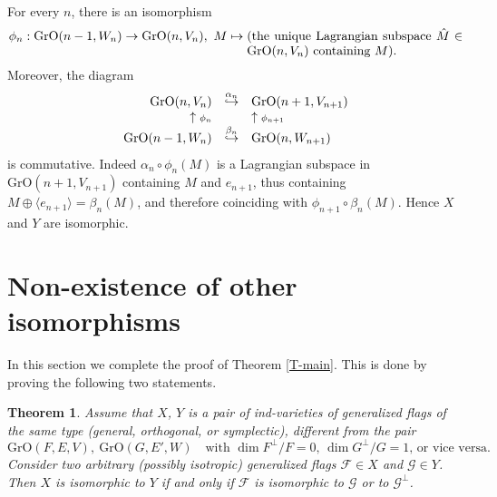 \documentclass[12pt]{amsart}
\newcommand{\OGrass}{\mathrm{GrO}}
\newtheorem{theorem}{Theorem}[section]
\theoremstyle{definition}
\begin{document}
For every $n$, there is an isomorphism
$$
\phi_n:\OGrass(n-1,W_n)\to \OGrass(n,V_n),\ M\mapsto\parbox[t]{6cm}{(the unique Lagrangian subspace $\hat{M}\in \OGrass(n,V_n)$ containing $M$).}
$$
Moreover, the  diagram
$$
\begin{array}{rcl}
\OGrass(n,V_n) & \stackrel{\alpha_n}{\hookrightarrow} & \OGrass(n+1,V_{n+1}) \\
\uparrow\mbox{\scriptsize $\phi_n$} & & \uparrow\mbox{\scriptsize $\phi_{n+1}$} \\
\OGrass(n-1,W_n) & \stackrel{\beta_n}{\hookrightarrow} & \OGrass(n,W_{n+1})
\end{array}
$$
is commutative. Indeed $\alpha_n\circ\phi_n(M)$ is a Lagrangian subspace in $\OGrass(n+1,V_{n+1})$ containing $M$ and $e_{n+1}$, thus containing $M\oplus\langle e_{n+1}\rangle=\beta_n(M)$, and therefore coinciding with $\phi_{n+1}\circ\beta_n(M)$.
Hence $X$ and $Y$ are isomorphic.



\section{Non-existence of other isomorphisms} \label{section-5}


In this section we complete the proof of Theorem \ref{T-main}. This is done by proving the following two statements.

\begin{theorem}
\label{T5.1}
Assume that $X$, $Y$ is a pair of ind-varieties of generalized flags of the same type (general, orthogonal, or symplectic), different from the pair 
$$
\OGrass(F,E,V),\ \OGrass(G,E',W)\quad\mbox{with $\dim F^\perp/F=0$, $\dim G^\perp/G=1$, or vice versa.}
$$
Consider two arbitrary (possibly isotropic) generalized flags $\mathcal{F}\in X$ and $\mathcal{G}\in Y$.
Then $X$ is isomorphic to $Y$ if and only if $\mathcal{F}$ is isomorphic to $\mathcal{G}$ or to $\mathcal{G}^\perp$.
\end{theorem}
\end{document}
